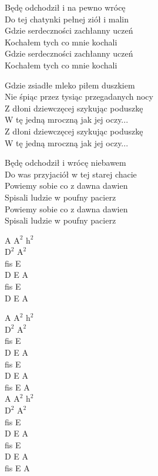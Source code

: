\begin{text}
Będę odchodził i na pewno wrócę\\
Do tej chatynki pełnej ziół i malin\\
Gdzie serdeczności zachłanny uczeń\\
Kochałem tych co mnie kochali\\
Gdzie serdeczności zachłanny uczeń\\
Kochałem tych co mnie kochali

Gdzie zsiadłe mleko piłem duszkiem\\
Nie śpiąc przez tysiąc przegadanych nocy\\
Z dłoni dziewczęcej szykując poduszkę\\
W tę jedną mroczną jak jej oczy...\\
Z dłoni dziewczęcej szykując poduszkę\\
W tę jedną mroczną jak jej oczy...

Będę odchodził i wrócę niebawem\\
Do was przyjaciół w tej starej chacie\\
Powiemy sobie co z dawna dawien\\
Spisali ludzie w poufny pacierz\\
Powiemy sobie co z dawna dawien\\
Spisali ludzie w poufny pacierz

\end{text}
\begin{chord}
    A $\mathrm{A^2}$ $\mathrm{h^2}$\\
    $\mathrm{D^2}$ $\mathrm{A^2}$\\
    fis E\\
    D E A\\
    fis E\\
    D E A

    A $\mathrm{A^2}$ $\mathrm{h^2}$\\
    $\mathrm{D^2}$ $\mathrm{A^2}$\\
    fis E\\
    D E A\\
    fis E\\
    D E A\\
    fis E A\\
    A $\mathrm{A^2}$ $\mathrm{h^2}$\\
    $\mathrm{D^2}$ $\mathrm{A^2}$\\
    fis E\\
    D E A\\
    fis E\\
    D E A\\
    fis E A
\end{chord}
